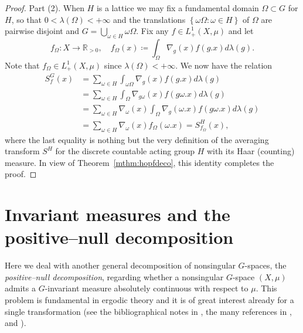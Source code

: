 \documentclass{amsart}
\numberwithin{equation}{subsection}
\begin{document}
\begin{proof}
Part (2). When \(H\) is a lattice we may fix a fundamental domain \(\Omega\subset G\) for \(H\), so that \(0<\lambda\left(\Omega\right)<+\infty\) and the translations \(\left\{\omega\Omega:\omega\in H\right\}\) of \(\Omega\) are pairwise disjoint and \(G=\bigcup_{\omega\in H}\omega\Omega\). Fix any \(f\in L_{+}^{1}\left(X,\mu\right)\) and let
\[f_{\Omega}:X\to\mathbb{R}_{>0},\quad f_{\Omega}\left(x\right)\coloneqq \int_{\Omega}\nabla_{g}\left(x\right)f\left(g.x\right)d\lambda\left(g\right).\]
Note that \(f_{\Omega}\in L_{+}^{1}\left(X,\mu\right)\) since \(\lambda\left(\Omega\right)<+\infty\). We now have the relation
\begin{align*}
S_{f}^{G}\left(x\right)
&=\sum\nolimits_{\omega \in H}\int_{\omega\Omega}\nabla_{g}\left(x\right)f\left(g.x\right)d\lambda\left(g\right)\\
&=\sum\nolimits_{\omega \in H}\int_{\Omega}\nabla_{g\omega}\left(x\right)f\left(g\omega.x\right)d\lambda\left(g\right)\\
&=\sum\nolimits_{\omega \in H}\nabla_{\omega}\left(x\right)\int_{\Omega}\nabla_{g}\left(\omega.x\right)f\left(g\omega.x\right)d\lambda\left(g\right)\\
&=\sum\nolimits_{\omega \in H}\nabla_{\omega}\left(x\right)f_{\Omega}\left(\omega.x\right)=S_{f_{\Omega}}^{H}\left(x\right),
\end{align*}
where the last equality is nothing but the very definition of the averaging transform \(S^{H}\) for the discrete countable acting group \(H\) with its Haar (counting) measure. In view of Theorem~\ref{mthm:hopfdeco}, this identity completes the proof.
\end{proof}

\section{Invariant measures and the positive--null decomposition}

Here we deal with another general decomposition of nonsingular \(G\)-spaces, the \emph{positive--null decomposition}, regarding whether a nonsingular \(G\)-space \(\left(X,\mu\right)\) admits a \(G\)-invariant measure absolutely continuous with respect to \(\mu\). This problem is fundamental in ergodic theory and it is of great interest already for a single transformation (see the bibliographical notes in \cite[\S3.4, pp. 144--146, \S6.3, pp. 220--221]{krengel1985ergodic}, the many references in \cite{danilenko2023ergodic}, and \cite[\S10]{nadkarni2013basic}).
\end{document}
